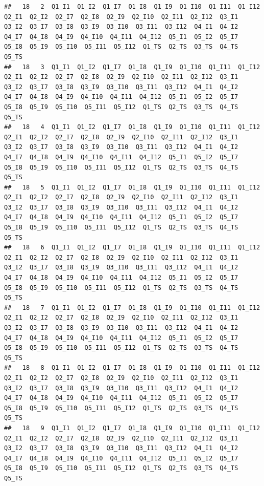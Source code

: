 \documentclass[
]{book}
\begin{document}
\begin{verbatim}
##   18   2  Q1_I1  Q1_I2  Q1_I7  Q1_I8  Q1_I9  Q1_I10  Q1_I11  Q1_I12  Q2_I1  Q2_I2  Q2_I7  Q2_I8  Q2_I9  Q2_I10  Q2_I11  Q2_I12  Q3_I1  Q3_I2  Q3_I7  Q3_I8  Q3_I9  Q3_I10  Q3_I11  Q3_I12  Q4_I1  Q4_I2  Q4_I7  Q4_I8  Q4_I9  Q4_I10  Q4_I11  Q4_I12  Q5_I1  Q5_I2  Q5_I7  Q5_I8  Q5_I9  Q5_I10  Q5_I11  Q5_I12  Q1_TS  Q2_TS  Q3_TS  Q4_TS  Q5_TS
##   18   3  Q1_I1  Q1_I2  Q1_I7  Q1_I8  Q1_I9  Q1_I10  Q1_I11  Q1_I12  Q2_I1  Q2_I2  Q2_I7  Q2_I8  Q2_I9  Q2_I10  Q2_I11  Q2_I12  Q3_I1  Q3_I2  Q3_I7  Q3_I8  Q3_I9  Q3_I10  Q3_I11  Q3_I12  Q4_I1  Q4_I2  Q4_I7  Q4_I8  Q4_I9  Q4_I10  Q4_I11  Q4_I12  Q5_I1  Q5_I2  Q5_I7  Q5_I8  Q5_I9  Q5_I10  Q5_I11  Q5_I12  Q1_TS  Q2_TS  Q3_TS  Q4_TS  Q5_TS
##   18   4  Q1_I1  Q1_I2  Q1_I7  Q1_I8  Q1_I9  Q1_I10  Q1_I11  Q1_I12  Q2_I1  Q2_I2  Q2_I7  Q2_I8  Q2_I9  Q2_I10  Q2_I11  Q2_I12  Q3_I1  Q3_I2  Q3_I7  Q3_I8  Q3_I9  Q3_I10  Q3_I11  Q3_I12  Q4_I1  Q4_I2  Q4_I7  Q4_I8  Q4_I9  Q4_I10  Q4_I11  Q4_I12  Q5_I1  Q5_I2  Q5_I7  Q5_I8  Q5_I9  Q5_I10  Q5_I11  Q5_I12  Q1_TS  Q2_TS  Q3_TS  Q4_TS  Q5_TS
##   18   5  Q1_I1  Q1_I2  Q1_I7  Q1_I8  Q1_I9  Q1_I10  Q1_I11  Q1_I12  Q2_I1  Q2_I2  Q2_I7  Q2_I8  Q2_I9  Q2_I10  Q2_I11  Q2_I12  Q3_I1  Q3_I2  Q3_I7  Q3_I8  Q3_I9  Q3_I10  Q3_I11  Q3_I12  Q4_I1  Q4_I2  Q4_I7  Q4_I8  Q4_I9  Q4_I10  Q4_I11  Q4_I12  Q5_I1  Q5_I2  Q5_I7  Q5_I8  Q5_I9  Q5_I10  Q5_I11  Q5_I12  Q1_TS  Q2_TS  Q3_TS  Q4_TS  Q5_TS
##   18   6  Q1_I1  Q1_I2  Q1_I7  Q1_I8  Q1_I9  Q1_I10  Q1_I11  Q1_I12  Q2_I1  Q2_I2  Q2_I7  Q2_I8  Q2_I9  Q2_I10  Q2_I11  Q2_I12  Q3_I1  Q3_I2  Q3_I7  Q3_I8  Q3_I9  Q3_I10  Q3_I11  Q3_I12  Q4_I1  Q4_I2  Q4_I7  Q4_I8  Q4_I9  Q4_I10  Q4_I11  Q4_I12  Q5_I1  Q5_I2  Q5_I7  Q5_I8  Q5_I9  Q5_I10  Q5_I11  Q5_I12  Q1_TS  Q2_TS  Q3_TS  Q4_TS  Q5_TS
##   18   7  Q1_I1  Q1_I2  Q1_I7  Q1_I8  Q1_I9  Q1_I10  Q1_I11  Q1_I12  Q2_I1  Q2_I2  Q2_I7  Q2_I8  Q2_I9  Q2_I10  Q2_I11  Q2_I12  Q3_I1  Q3_I2  Q3_I7  Q3_I8  Q3_I9  Q3_I10  Q3_I11  Q3_I12  Q4_I1  Q4_I2  Q4_I7  Q4_I8  Q4_I9  Q4_I10  Q4_I11  Q4_I12  Q5_I1  Q5_I2  Q5_I7  Q5_I8  Q5_I9  Q5_I10  Q5_I11  Q5_I12  Q1_TS  Q2_TS  Q3_TS  Q4_TS  Q5_TS
##   18   8  Q1_I1  Q1_I2  Q1_I7  Q1_I8  Q1_I9  Q1_I10  Q1_I11  Q1_I12  Q2_I1  Q2_I2  Q2_I7  Q2_I8  Q2_I9  Q2_I10  Q2_I11  Q2_I12  Q3_I1  Q3_I2  Q3_I7  Q3_I8  Q3_I9  Q3_I10  Q3_I11  Q3_I12  Q4_I1  Q4_I2  Q4_I7  Q4_I8  Q4_I9  Q4_I10  Q4_I11  Q4_I12  Q5_I1  Q5_I2  Q5_I7  Q5_I8  Q5_I9  Q5_I10  Q5_I11  Q5_I12  Q1_TS  Q2_TS  Q3_TS  Q4_TS  Q5_TS
##   18   9  Q1_I1  Q1_I2  Q1_I7  Q1_I8  Q1_I9  Q1_I10  Q1_I11  Q1_I12  Q2_I1  Q2_I2  Q2_I7  Q2_I8  Q2_I9  Q2_I10  Q2_I11  Q2_I12  Q3_I1  Q3_I2  Q3_I7  Q3_I8  Q3_I9  Q3_I10  Q3_I11  Q3_I12  Q4_I1  Q4_I2  Q4_I7  Q4_I8  Q4_I9  Q4_I10  Q4_I11  Q4_I12  Q5_I1  Q5_I2  Q5_I7  Q5_I8  Q5_I9  Q5_I10  Q5_I11  Q5_I12  Q1_TS  Q2_TS  Q3_TS  Q4_TS  Q5_TS

\end{verbatim}
\end{document}

